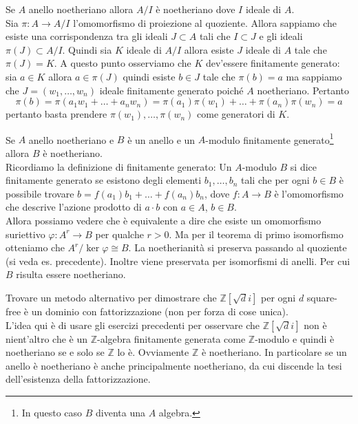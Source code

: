 \begin{esercizio}
	Se $A$ anello noetheriano allora $A/I$ è noetheriano dove $I$ ideale di $A$.\\
	
	Sia $\pi \colon A \to A/I$ l'omomorfismo di proiezione al quoziente.
	Allora sappiamo che esiste una corrispondenza tra gli ideali $J \subset A$ tali
	che $I \subset J$ e gli ideali $\pi(J) \subset A/I$. 
	Quindi sia $K$ ideale di $A/I$ allora esiste $J$ ideale di $A$ tale che 
	$\pi(J) = K$. A questo punto osserviamo che $K$ dev'essere finitamente generato:
	sia $a \in K$ allora $a \in \pi(J)$ quindi esiste $b \in J$ tale che $\pi(b) =a$
	ma sappiamo che $J = (w_1, \dots, w_n)$ ideale finitamente generato poiché $A$ noetheriano. Pertanto 
	\begin{equation*}
		\pi(b) = \pi(a_1 w_1 + \dots + a_n w_n) = \pi(a_1) \pi(w_1) + \dots + 
					\pi(a_n)\pi(w_n) = a
	\end{equation*}     
 	pertanto basta prendere $\pi(w_1), \dots, \pi(w_n)$ come 
 	generatori di $K$. 
\end{esercizio}

\begin{esercizio}
	Se $A$ anello noetheriano e $B$ è un anello e un $A$-modulo finitamente generato\footnote{In questo caso $B$ diventa una $A$ algebra.} allora $B$ è noetheriano.\\
	
	Ricordiamo la definizione di finitamente generato:
	Un $A$-modulo $B$ si dice finitamente generato se esistono 
	degli elementi $b_1, \dots, b_n$ tali che per ogni $b \in B$ è possibile trovare $b = f(a_1)b_1 + \dots + f(a_n)b_n$, dove $f \colon A \to B$ è l'omomorfismo che
	descrive l'azione prodotto di $a\cdot b$ con $a\in A$, $b\in B$.\\
	
	Allora possiamo vedere che è equivalente a dire che esiste
	un omomorfismo suriettivo $\varphi \colon A^r \to B$ per 
	qualche $r > 0$. Ma per il teorema di primo isomorfismo
	otteniamo che $A^r/\ker \varphi \cong B$. La noetherianità 
	si preserva passando al quoziente (si veda es. 
	precedente). Inoltre viene preservata per isomorfismi di
	anelli. Per cui $B$ risulta essere noetheriano. 
\end{esercizio}

\begin{esercizio}
	Trovare un metodo alternativo per dimostrare che $\mathbb{Z}[\sqrt{d}i]$ per ogni $d$ square-free 
	è un dominio con fattorizzazione (non per forza di cose unica).\\
	
	L'idea qui è di usare gli esercizi precedenti per osservare che $\mathbb{Z}[\sqrt{d}i]$ non è 
	nient'altro che è un $\mathbb{Z}$-algebra finitamente generata come $\mathbb{Z}$-modulo e quindi
	è noetheriano se e solo se $\mathbb{Z}$ lo è. Ovviamente $\mathbb{Z}$ è noetheriano.
	In particolare se un anello è noetheriano è anche principalmente noetheriano, da cui discende 
	la tesi dell'esistenza della fattorizzazione.
\end{esercizio}

